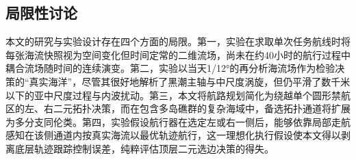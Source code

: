\begin{table}[htbp]
\centering
\caption{不同海流图质量、航行器速度及合理集合构造方法下的适用范围与消融实验结果（损失单位：小时）。}
\label{tab:scope}
\small

\end{table}

\subsection{局限性讨论}
本文的研究与实验设计存在四个方面的局限。第一，实验在求取单次任务航线时将每张海流快照视为空间变化但时间定常的二维流场，尚未在约40小时的航行过程中耦合流场随时间的连续演变。第二，实验以当天1/12°的再分析海流场作为检验决策的“真实海洋”，尽管其很好地解析了黑潮主轴与中尺度涡旋，但仍平滑了数千米以下的亚中尺度过程与内波扰动。第三，本文将航路规划简化为绕越单个圆形禁航区的左、右二元拓扑决策，而在包含多岛礁群的复杂海域中，备选拓扑通道将扩展为多分支同伦类。第四，实验假设航行器在选定左或右一侧后，能够依靠局部走航感知在该侧通道内按真实海流以最优轨迹航行，这一理想化执行假设使本文得以剥离底层轨迹跟踪控制误差，纯粹评估顶层二元选边决策的得失。

